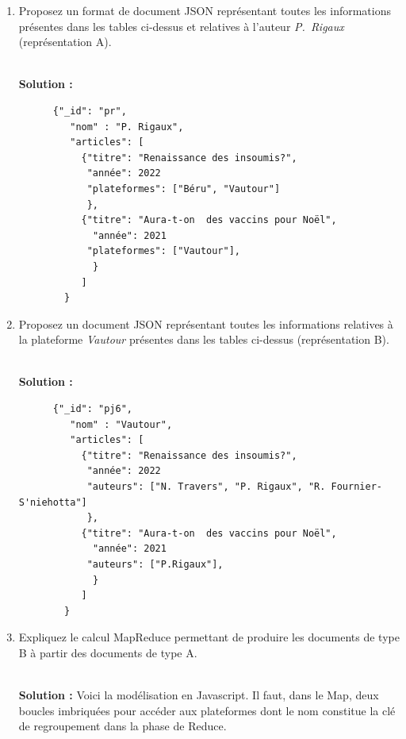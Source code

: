 \documentclass[11pt,a4paper]{article}
\newenvironment{solution}[0]{
~\\ \color{red} \textbf{Solution : }\color{black}}{%
}
\begin{document}
\begin{enumerate}
  \item Proposez un format de document JSON représentant toutes les informations présentes dans les  
        tables ci-dessus et
        relatives à l'auteur \emph{P.~Rigaux} (représentation A).


\begin{solution}
    \begin{small}
    \begin{verbatim}
      {"_id": "pr",
         "nom" : "P. Rigaux",
         "articles": [
           {"titre": "Renaissance des insoumis?", 
            "année": 2022
            "plateformes": ["Béru", "Vautour"]
            },
           {"titre": "Aura-t-on  des vaccins pour Noël", 
             "année": 2021
            "plateformes": ["Vautour"],
             }
           ]
        }
    \end{verbatim}
    \end{small}
\end{solution}

  \item Proposez un document JSON représentant toutes les 
        informations relatives à la plateforme \emph{Vautour} 
        présentes dans les tables ci-dessus
         (représentation B).
        

\begin{solution}
    \begin{small}
    \begin{verbatim}
      {"_id": "pj6",
         "nom" : "Vautour",
         "articles": [
           {"titre": "Renaissance des insoumis?", 
            "année": 2022
            "auteurs": ["N. Travers", "P. Rigaux", "R. Fournier-S'niehotta"]
            },
           {"titre": "Aura-t-on  des vaccins pour Noël", 
             "année": 2021
            "auteurs": ["P.Rigaux"],
             }
           ]
        }
    \end{verbatim}
    \end{small}
\end{solution}


   \item Expliquez le calcul MapReduce permettant de produire les documents
   de type B à partir des documents de type A.


\begin{solution}
   Voici la modélisation en Javascript. Il faut, dans le Map, deux boucles imbriquées pour 
      accéder aux plateformes dont le nom constitue la clé de regroupement dans la phase de Reduce. 


\end{solution}
\end{enumerate}
\end{document}
